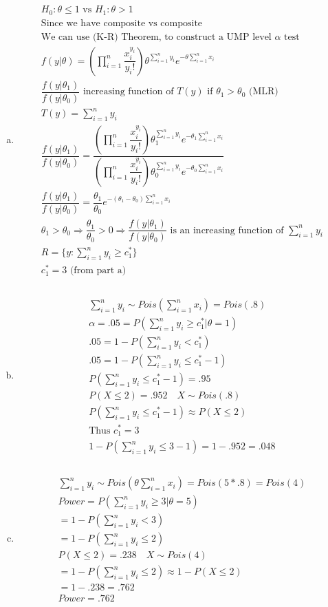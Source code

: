 \documentclass{article}
\newcommand{\sumn}{\sum_{i=1}^{n}}
\newcommand{\prodn}{\prod_{i=1}^{n}}
\newcommand{\sumx}{\sum_{i=1}^{n}x_i}
\newcommand{\ta}{\theta}
\newcommand{\te}{\theta_1}
\begin{document}
\begin{flushleft}
\begin{enumerate}[(a)]
	\item 
\begin{multline*}\\
H_0:\ta\leq 1 \text{ vs } H_1:\ta>1\\
\text{Since we have composite vs composite}\\
\text{We can use (K-R) Theorem, to construct a UMP level } \alpha \text{ test}\\
f(y|\ta)=\left(\prodn\dfrac{x_i^{y_i}}{y_i!}\right)\ta^{\sumn y_i}e^{-\ta \sumx}\\
\dfrac{f(y|\te)}{f(y|\ta_0)} \text{ increasing function of } T(y) \text{ if } \te>\ta_0 \text{ (MLR)}\\
T(y)=\sumn y_i\\
\dfrac{f(y|\te)}{f(y|\ta_0)}=\dfrac{\left(\prodn\dfrac{x_i^{y_i}}{y_i!}\right)\te^{\sumn y_i}e^{-\te \sumx}}{\left(\prodn\dfrac{x_i^{y_i}}{y_i!}\right)\ta_0^{\sumn y_i}e^{- \ta_0\sumx}}\\
\dfrac{f(y|\te)}{f(y|\ta_0)}=\dfrac{\te}{\ta_0}e^{-(\ta_1-\ta_0)\sumx}\\
\ta_1>\ta_0\Rightarrow \dfrac{\te}{\ta_0}>0 \Rightarrow \dfrac{f(y|\te)}{f(y|\ta_0)} \text{ is an increasing function of } \sumn y_i\\ 
R=\{y:\sumn y_i \geq c_1^*\}\\
c_1^*=3 \text{ (from part a)}\\
\end{multline*}

	\item 
\begin{multline*}\\
\sumn y_i\sim Pois(\sumx)=Pois(.8)\\
\alpha=.05=P(\sumn y_i\geq c_1^*|\ta=1)\\
.05=1-P(\sumn y_i<c_1^*)\\
.05=1-P(\sumn y_i\leq c_1^*-1)\\
P(\sumn y_i\leq c_1^*-1)=.95\\
P(X\leq 2)=.952 \quad X\sim Pois(.8)\\
P(\sumn y_i\leq c_1^*-1)\approx P(X\leq 2)\\
\text{Thus } c_1^*=3\\
1-P(\sumn y_i\leq 3-1)=1-.952= .048\\
\end{multline*}

	\item 
\begin{multline*}\\
\sumn y_i \sim Pois(\theta \sumx)=Pois(5*.8)=Pois(4)\\
Power=P(\sumn y_i\geq 3|\ta=5)\\
=1-P(\sumn y_i <3)\\
=1-P(\sumn y_i \leq 2)\\
P(X\leq 2)=.238 \quad X\sim Pois(4)\\
=1-P(\sumn y_i \leq 2)\approx 1-P(X\leq 2)\\
=1-.238=.762\\
Power=.762\\
\end{multline*}
	

\end{enumerate}
\end{flushleft}
\end{document}
